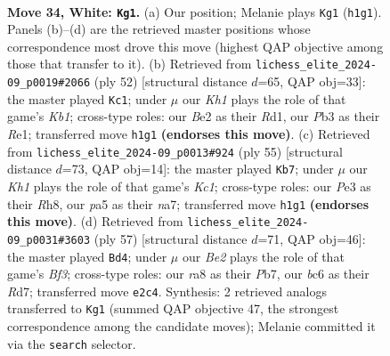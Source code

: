 \documentclass[11pt]{article}
\begin{document}
\clearpage

\begin{figure}[p]\centering
\begin{subfigure}{0.46\textwidth}\centering
\resizebox{\linewidth}{!}{%
\newchessgame
\chessboard[
  setfen={r5k1/2r2ppp/nnbN4/p3p1P1/8/1P2P1R1/P3B1PP/RN5K w - - 6 34},
  showmover=false,
  pgfstyle=straightmove, color=movearrow, markmove={h1-g1}
]}
\caption{}
\end{subfigure}\hfill
\begin{subfigure}{0.46\textwidth}\centering
\resizebox{\linewidth}{!}{%
\newchessgame
\chessboard[
  setfen={3r2k1/pp3pb1/6pp/2prP2n/5P2/PP6/1BP1N2P/1K1RR3 w - - 2 27},
  showmover=false,
  pgfstyle=straightmove, color=movearrow, markmove={b1-c1}
]}
\caption{}
\end{subfigure}
\\[4pt]
\begin{subfigure}{0.46\textwidth}\centering
\resizebox{\linewidth}{!}{%
\newchessgame
\chessboard[
  setfen={2k4r/N1pr2bp/1p1n2p1/8/P3p3/4B3/1PP2PPP/1K1RR3 b - - 0 28},
  showmover=false,
  pgfstyle=straightmove, color=movearrow, markmove={c8-b7}
]}
\caption{}
\end{subfigure}\hfill
\begin{subfigure}{0.46\textwidth}\centering
\resizebox{\linewidth}{!}{%
\newchessgame
\chessboard[
  setfen={3r2k1/pp1r1p1p/2p1pbp1/8/1P4P1/2NPBP2/1P2K3/3R3R b - - 0 29},
  showmover=false,
  pgfstyle=straightmove, color=movearrow, markmove={f6-d4}
]}
\caption{}
\end{subfigure}
\caption{\textbf{Move 34, White: \texttt{Kg1}.} (a) Our position; Melanie plays \texttt{Kg1} (\texttt{h1g1}). Panels (b)--(d) are the retrieved master positions whose correspondence most drove this move (highest QAP objective among those that transfer to it). (b) Retrieved from \texttt{lichess\_elite\_2024-09\_p0019\#2066} (ply 52) [structural distance $d$=65, QAP obj=33]: the master played \texttt{Kc1}; under $\mu$ our \emph{Kh1} plays the role of that game's \emph{Kb1}; cross-type roles: our \emph{B}e2 as their \emph{R}d1, our \emph{P}b3 as their \emph{R}e1; transferred move \texttt{h1g1} \textbf{(endorses this move)}. (c) Retrieved from \texttt{lichess\_elite\_2024-09\_p0013\#924} (ply 55) [structural distance $d$=73, QAP obj=14]: the master played \texttt{Kb7}; under $\mu$ our \emph{Kh1} plays the role of that game's \emph{Kc1}; cross-type roles: our \emph{P}e3 as their \emph{R}h8, our \emph{p}a5 as their \emph{n}a7; transferred move \texttt{h1g1} \textbf{(endorses this move)}. (d) Retrieved from \texttt{lichess\_elite\_2024-09\_p0031\#3603} (ply 57) [structural distance $d$=71, QAP obj=46]: the master played \texttt{Bd4}; under $\mu$ our \emph{Be2} plays the role of that game's \emph{Bf3}; cross-type roles: our \emph{r}a8 as their \emph{P}b7, our \emph{b}c6 as their \emph{R}d7; transferred move \texttt{e2c4}. Synthesis: 2 retrieved analogs transferred to \texttt{Kg1} (summed QAP objective 47, the strongest correspondence among the candidate moves); Melanie committed it via the \texttt{search} selector.}
\label{fig:thought-m66}
\end{figure}
\end{document}
